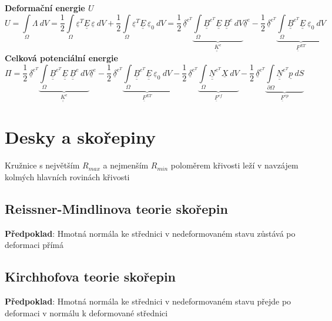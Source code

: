 \documentclass[10pt,oneside]{article}
\newcommand{\ul}[1]{\underline{#1}}
\newcommand{\ull}[1]{\underline{\underline{#1}}}
\begin{document}
\textbf{Deformační energie $U$}
\begin{equation*}
U = \int\limits_\Omega \Lambda \ dV
	= \frac{1}{2} \int\limits_\Omega \ul{\varepsilon}^T \ull{E}\,\ul{\varepsilon} \ dV
	+ \frac{1}{2} \int\limits_\Omega \ul{\varepsilon}^T \ull{E}\,\ul{\varepsilon}_0 \ dV
	= \frac{1}{2}\,\ul{\delta}^{e^T}\!\underbrace{\int\limits_\Omega \ull{B}^{e^T}\!\ull{E}\ \ull{B}^e\,dV}_{\ull{K}^e} \ul{\delta}^e
	- \frac{1}{2}\,\ul{\delta}^{e^T}\!\underbrace{\int\limits_\Omega \ull{B}^{e^T}\!\ull{E}\ \ul{\varepsilon}_0 \ dV}_{\ul{F}^{ET}}
\end{equation*}
%
%
\textbf{Celková potenciální energie}
\begin{equation*}
	\Pi = \frac{1}{2}\,\ul{\delta}^{e^T}\!\underbrace{\int\limits_\Omega \ull{B}^{e^T}\!\ull{E}\ \ull{B}^e\,dV}_{\ull{K}^e} \ul{\delta}^e
		- \frac{1}{2}\,\ul{\delta}^{e^T}\!\underbrace{\int\limits_\Omega \ull{B}^{e^T}\!\ull{E}\ \ul{\varepsilon}_0 \ dV}_{\ul{F}^{ET}}
		- \frac{1}{2}\,\ul{\delta}^{e^T}\!\underbrace{\int\limits_\Omega \ull{N}^{e^T}\!\ul{X} \ dV}_{\ul{F}^{ef}}
		- \frac{1}{2}\,\ul{\delta}^{e^T}\!\underbrace{\int\limits_{\partial\Omega} \ull{N}^{e^T}\!\ul{p} \ dS}_{\ul{F}^{ep}}
\end{equation*}

\newpage
\section*{Desky a skořepiny}

Kružnice s největším $R_{max}$ a nejmenším $R_{min}$ poloměrem křivosti leží v navzájem kolmých hlavních rovinách křivosti

\subsection*{Reissner-Mindlinova teorie skořepin}
%
\textbf{Předpoklad}: Hmotná normála ke střednici v nedeformovaném stavu zůstává po deformaci přímá

\subsection*{Kirchhofova teorie skořepin}
%
\textbf{Předpoklad}: Hmotná normála ke střednici v nedeformovaném stavu přejde po deformaci v normálu k deformované střednici
\end{document}
